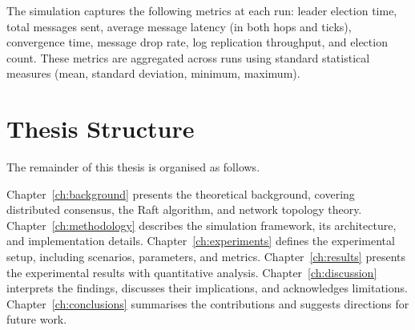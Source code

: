 The simulation captures the following metrics at each run: leader election time, total messages sent, average message latency (in both hops and ticks), convergence time, message drop rate, log replication throughput, and election count. These metrics are aggregated across runs using standard statistical measures (mean, standard deviation, minimum, maximum).

\section{Thesis Structure}

The remainder of this thesis is organised as follows.

Chapter~\ref{ch:background} presents the theoretical background, covering distributed consensus, the Raft algorithm, and network topology theory. Chapter~\ref{ch:methodology} describes the simulation framework, its architecture, and implementation details. Chapter~\ref{ch:experiments} defines the experimental setup, including scenarios, parameters, and metrics. Chapter~\ref{ch:results} presents the experimental results with quantitative analysis. Chapter~\ref{ch:discussion} interprets the findings, discusses their implications, and acknowledges limitations. Chapter~\ref{ch:conclusions} summarises the contributions and suggests directions for future work.

